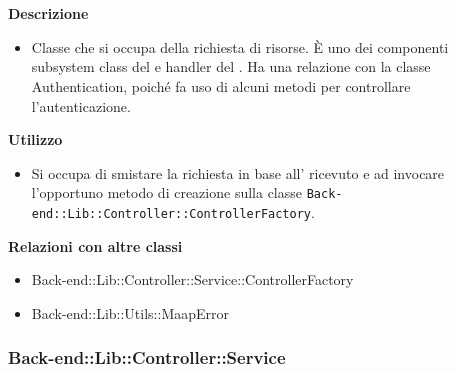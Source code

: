 				\textbf{\\ \\ Descrizione} 
					\begin{itemize}
						\item[] Classe che si occupa della richiesta di risorse. È uno dei componenti subsystem class del   e handler del  . Ha una relazione con la classe Authentication, poiché fa uso di alcuni metodi per controllare l'autenticazione.
					\end{itemize}      
				\textbf{Utilizzo}  
					\begin{itemize}
						\item[] Si occupa di smistare la richiesta in base all' ricevuto e ad invocare l'opportuno metodo di creazione sulla classe \texttt{Back-end::Lib::Controller::ControllerFactory}.
					\end{itemize}
					\textbf{Relazioni con altre classi}
					\begin{itemize}
							\item{Back-end::Lib::Controller::Service::ControllerFactory}
							\item{Back-end::Lib::Utils::MaapError}
					\end{itemize}
	\subsubsection{Back-end::Lib::Controller::Service}
